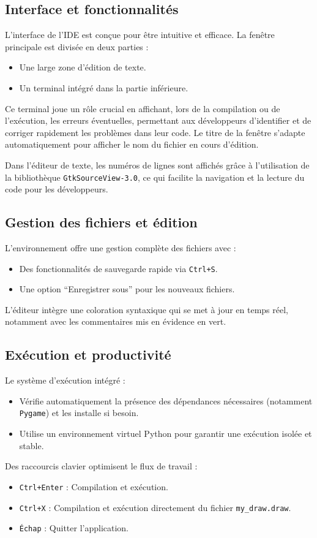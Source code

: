 \documentclass[12pt,a4paper]{article}
\begin{document}
\subsection{Interface et fonctionnalités}
L'interface de l'IDE est conçue pour être intuitive et efficace. La fenêtre principale est divisée en deux parties :
\begin{itemize}
    \item Une large zone d'édition de texte.
    \item Un terminal intégré dans la partie inférieure.
\end{itemize}

Ce terminal joue un rôle crucial en affichant, lors de la compilation ou de l'exécution, les erreurs éventuelles, permettant aux développeurs d'identifier et de corriger rapidement les problèmes dans leur code. Le titre de la fenêtre s'adapte automatiquement pour afficher le nom du fichier en cours d'édition.

Dans l'éditeur de texte, les numéros de lignes sont affichés grâce à l'utilisation de la bibliothèque \texttt{GtkSourceView-3.0}, ce qui facilite la navigation et la lecture du code pour les développeurs.

\subsection{Gestion des fichiers et édition}
L'environnement offre une gestion complète des fichiers avec :
\begin{itemize}
    \item Des fonctionnalités de sauvegarde rapide via \texttt{Ctrl+S}.
    \item Une option ``Enregistrer sous'' pour les nouveaux fichiers.
\end{itemize}

L'éditeur intègre une coloration syntaxique qui se met à jour en temps réel, notamment avec les commentaires mis en évidence en vert.

\subsection{Exécution et productivité}
Le système d'exécution intégré :
\begin{itemize}
    \item Vérifie automatiquement la présence des dépendances nécessaires (notamment \texttt{Pygame}) et les installe si besoin.
    \item Utilise un environnement virtuel Python pour garantir une exécution isolée et stable.
\end{itemize}

Des raccourcis clavier optimisent le flux de travail :
\begin{itemize}
    \item \texttt{Ctrl+Enter} : Compilation et exécution.
    \item \texttt{Ctrl+X} : Compilation et exécution directement du fichier \texttt{my\_draw.draw}.
    \item \texttt{Échap} : Quitter l'application.
\end{itemize}
\end{document}
